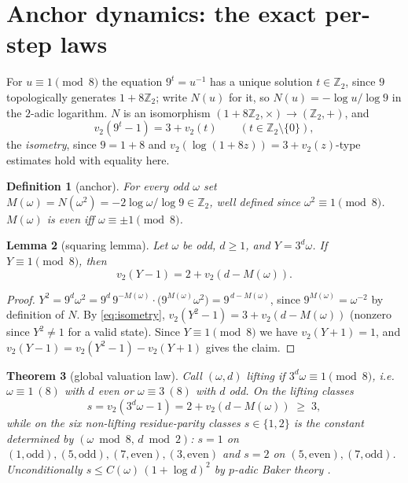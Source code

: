 \documentclass[11pt]{article}
\newtheorem{theorem}{Theorem}[section]
\newtheorem{lemma}[theorem]{Lemma}
\newtheorem{definition}[theorem]{Definition}
\theoremstyle{remark}
\newcommand{\Z}{\mathbb{Z}}
\newcommand{\vt}[1]{v_2\!\left(#1\right)}
\newcommand{\w}{\omega}
\begin{document}
\section{Anchor dynamics: the exact per-step laws}\label{sec:anchor}

For $u \equiv 1 \pmod 8$ the equation $9^{t} = u^{-1}$ has a unique solution $t \in \Z_2$, since $9$ topologically generates $1 + 8\Z_2$; write $N(u)$ for it, so $N(u) = -\log u/\log 9$ in the $2$-adic logarithm. $N$ is an isomorphism $(1+8\Z_2,\times)\to(\Z_2,+)$, and
\begin{equation}\label{eq:isometry}
\vt{9^t - 1} = 3 + \vt{t}\qquad (t \in \Z_2\setminus\{0\}),
\end{equation}
the \emph{isometry}, since $9 = 1 + 8$ and $\vt{\log(1+8z)} = 3 + \vt{z}$-type estimates hold with equality here.

\begin{definition}[anchor]
For every odd $\w$ set $M(\w) = N(\w^2) = -2\log\w/\log 9 \in \Z_2$, well defined since $\w^2\equiv 1 \pmod 8$. $M(\w)$ is even iff $\w\equiv\pm1\pmod 8$.
\end{definition}

\begin{lemma}[squaring lemma]\label{lem:squaring}
Let $\w$ be odd, $d \ge 1$, and $Y = 3^d\w$. If $Y \equiv 1 \pmod 8$, then
\[ \vt{Y - 1} = 2 + \vt{d - M(\w)}. \]
\end{lemma}

\begin{proof}
$Y^2 = 9^d\w^2 = 9^{d}\,9^{-M(\w)}\cdot\bigl(9^{M(\w)}\w^2\bigr) = 9^{\,d - M(\w)}$, since $9^{M(\w)} = \w^{-2}$ by definition of $N$. By \eqref{eq:isometry}, $\vt{Y^2 - 1} = 3 + \vt{d - M(\w)}$ (nonzero since $Y^2 \neq 1$ for a valid state). Since $Y \equiv 1 \pmod 8$ we have $\vt{Y+1} = 1$, and $\vt{Y-1} = \vt{Y^2-1} - \vt{Y+1}$ gives the claim.
\end{proof}

\begin{theorem}[global valuation law]\label{thm:vlaw}
Call $(\w,d)$ \emph{lifting} if $3^d\w \equiv 1 \pmod 8$, i.e.\ $\w\equiv1\ (8)$ with $d$ even or $\w\equiv3\ (8)$ with $d$ odd. On the lifting classes
\[ s = \vt{3^d\w - 1} = 2 + \vt{d - M(\w)} \;\ge\; 3, \]
while on the six non-lifting residue-parity classes $s \in \{1,2\}$ is the constant determined by $(\w \bmod 8,\, d \bmod 2)$: $s = 1$ on $(1,\mathrm{odd}), (5,\mathrm{odd}), (7,\mathrm{even}), (3,\mathrm{even})$ and $s = 2$ on $(5,\mathrm{even}), (7,\mathrm{odd})$. Unconditionally $s \le C(\w)\,(1 + \log d)^2$ by $p$-adic Baker theory \cite{yu,bl}.
\end{theorem}
\end{document}
